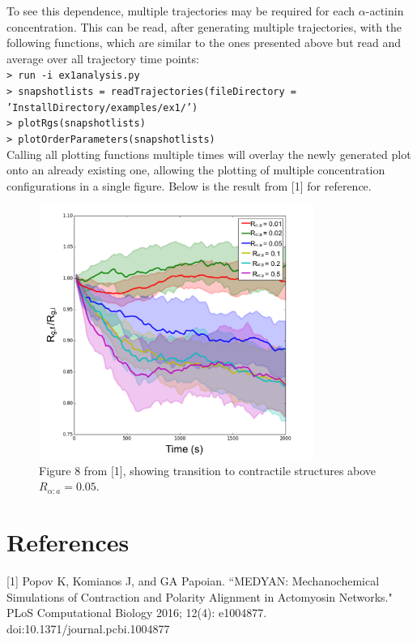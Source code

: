 \documentclass[11pt, oneside]{article}   	%
\begin{document}
To see this dependence, multiple trajectories may be required for each $\alpha$-actinin concentration. This can be read, after generating multiple trajectories, with the following functions, which are similar to the ones presented above but read and average over all trajectory time points:\\

\indent \texttt{> run -i ex1analysis.py}\\
\indent \texttt{> snapshotlists = readTrajectories(fileDirectory = 'InstallDirectory/examples/ex1/')}\\
\indent \texttt{> plotRgs(snapshotlists)}\\
\indent \texttt{> plotOrderParameters(snapshotlists)}\\

\noindent Calling all plotting functions multiple times will overlay the newly generated plot onto an already existing one, allowing the plotting of multiple concentration configurations in a single figure. Below is the result from [1] for reference.

\begin{figure}[h]
\caption{Figure 8 from [1], showing transition to contractile structures above $R_{\alpha:a}=0.05$.}
\centering
\includegraphics[width=0.8\textwidth]{Fig8}
\end{figure}

\section{References}

[1] Popov K, Komianos J, and GA Papoian. ``MEDYAN: Mechanochemical Simulations 
\indent of Contraction and Polarity Alignment in Actomyosin Networks." PLoS Computational \indent Biology 2016; 12(4): e1004877. doi:10.1371/journal.pcbi.1004877
\end{document}

